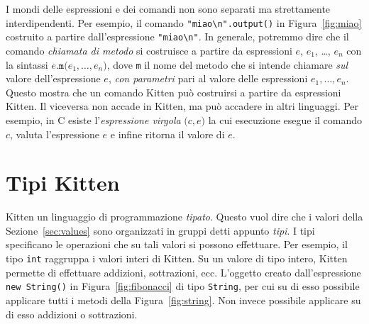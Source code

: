 I mondi delle espressioni e dei comandi non sono separati ma strettamente
interdipendenti. Per esempio, il comando
\verb|"miao\n".output()| in Figura~\ref{fig:miao} \e costruito a partire
dall'espressione \verb|"miao\n"|. In generale, potremmo dire che il
comando \emph{chiamata di metodo} si costruisce a partire da espressioni
$e$, $e_1$, \ldots, $e_n$ con la sintassi
$e\mathtt{.m(}e_1,\ldots,e_n\mathtt{)}$, dove \texttt{m} \e il nome del
metodo che si intende chiamare \emph{sul} valore dell'espressione
$e$, \emph{con parametri} pari al valore delle espressioni $e_1,\ldots,e_n$.
Questo mostra che un comando Kitten pu\`o costruirsi a partire da espressioni
Kitten. Il viceversa non accade in Kitten, ma pu\`o accadere
in altri linguaggi. Per esempio, in C esiste
l'\emph{espressione virgola} $\mathtt{(}c\mathtt{,}e\mathtt{)}$ la cui
esecuzione esegue il comando $c$, valuta l'espressione $e$ e infine
ritorna il valore di $e$.
%
\section{Tipi Kitten}\label{sec:types}
%
Kitten \e un linguaggio di programmazione \emph{tipato}. Questo vuol dire
che i valori della Sezione~\ref{sec:values} sono organizzati in gruppi
detti appunto \emph{tipi}. I tipi specificano le operazioni che su tali
valori si possono effettuare. Per esempio, il tipo \texttt{int} raggruppa
i valori interi di Kitten. Su un valore di tipo intero, Kitten permette di
effettuare addizioni, sottrazioni, ecc. L'oggetto creato dall'espressione
\texttt{new String()} in Figura~\ref{fig:fibonacci} \e di tipo \texttt{String},
per cui su di esso \e possibile applicare tutti i metodi della
Figura~\ref{fig:string}. Non \e invece possibile applicare su di esso
addizioni o sottrazioni.

